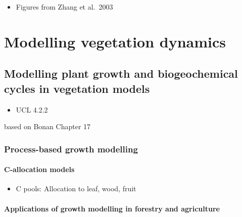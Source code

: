 \documentclass[
  oneside]{book}
\providecommand{\tightlist}{%
  \setlength{\itemsep}{0pt}\setlength{\parskip}{0pt}}
\begin{document}
\begin{itemize}
\tightlist
\item
  Figures from Zhang et al.~2003
\end{itemize}

\hypertarget{part-modelling-vegetation-dynamics}{%
\part{Modelling vegetation dynamics}\label{part-modelling-vegetation-dynamics}}

\hypertarget{modelling-plant-growth-and-biogeochemical-cycles-in-vegetation-models}{%
\chapter{Modelling plant growth and biogeochemical cycles in vegetation models}\label{modelling-plant-growth-and-biogeochemical-cycles-in-vegetation-models}}


\begin{itemize}
\tightlist
\item
  UCL 4.2.2
\end{itemize}

based on Bonan Chapter 17

\hypertarget{process-based-growth-modelling}{%
\section{Process-based growth modelling}\label{process-based-growth-modelling}}

\hypertarget{c-allocation-models}{%
\subsection{C-allocation models}\label{c-allocation-models}}

\begin{itemize}
\tightlist
\item
  C pools: Allocation to leaf, wood, fruit
\end{itemize}

\hypertarget{applications-of-growth-modelling-in-forestry-and-agriculture}{%
\subsection{Applications of growth modelling in forestry and agriculture}\label{applications-of-growth-modelling-in-forestry-and-agriculture}}
\end{document}
